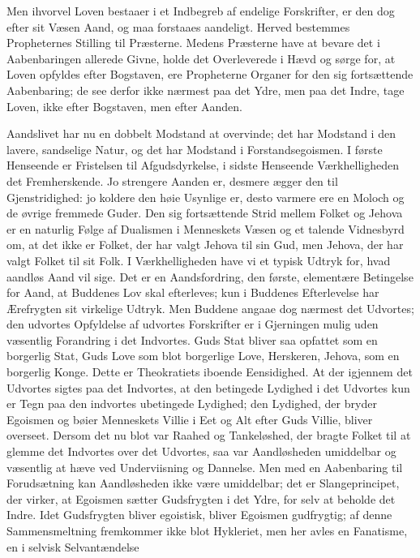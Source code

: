 \documentclass[12pt]{book}
\begin{document}
Men ihvorvel Loven bestaaer i et Indbegreb af endelige Forskrifter,
er den dog efter sit Væsen Aand, og maa forstaaes aandeligt. Herved
bestemmes Propheternes Stilling til Præsterne. Medens Præsterne have
at bevare det i Aabenbaringen allerede Givne, holde det Overleverede
i Hævd og sørge for, at Loven opfyldes efter Bogstaven, ere
Propheterne Organer for den sig fortsættende Aabenbaring; de see
derfor ikke nærmest paa det Ydre, men paa det Indre, tage Loven,
ikke efter Bogstaven, men efter Aanden.

Aandslivet har nu en dobbelt Modstand at overvinde; det har Modstand
i den lavere, sandselige Natur, og det har Modstand i
Forstandsegoismen. I første Henseende er Fristelsen til
Afgudsdyrkelse, i sidste Henseende Værkhelligheden det
Fremherskende. Jo strengere Aanden er, desmere ægger den til
Gjenstridighed: jo koldere den høie Usynlige er, desto varmere ere
en Moloch og de øvrige fremmede Guder. Den sig fortsættende Strid
mellem Folket og Jehova er en naturlig Følge af Dualismen i
Menneskets Væsen og et talende Vidnesbyrd om, at det ikke er Folket,
der har valgt Jehova til sin Gud, men Jehova, der har valgt Folket
til sit Folk. I Værkhelligheden have vi et typisk Udtryk for, hvad
aandløs Aand vil sige. Det er en Aandsfordring, den første,
elementære Betingelse for Aand, at Buddenes Lov skal efterleves; kun
i Buddenes Efterlevelse har Ærefrygten sit virkelige Udtryk. Men
Buddene angaae dog nærmest det Udvortes;
den udvortes Opfyldelse af udvortes Forskrifter er i Gjerningen
mulig uden væsentlig Forandring i det Indvortes. Guds Stat bliver
saa opfattet som en borgerlig Stat, Guds Love som blot borgerlige
Love, Herskeren, Jehova, som en borgerlig Konge. Dette er
Theokratiets iboende Eensidighed. At der igjennem det Udvortes
sigtes paa det Indvortes, at den betingede Lydighed i det Udvortes
kun er Tegn paa den indvortes ubetingede Lydighed; den Lydighed, der
bryder Egoismen og bøier Menneskets Villie i Eet og Alt efter Guds
Villie, bliver overseet. Dersom det nu blot var Raahed og
Tankeløshed, der bragte Folket til at glemme det Indvortes over det
Udvortes, saa var Aandløsheden umiddelbar og væsentlig at hæve ved
Underviisning og Dannelse. Men med en Aabenbaring til Forudsætning
kan Aandløsheden ikke være umiddelbar; det er Slangeprincipet, der
virker, at Egoismen sætter Gudsfrygten i det Ydre, for selv at
beholde det Indre. Idet Gudsfrygten bliver egoistisk, bliver
Egoismen gudfrygtig; af denne Sammensmeltning fremkommer ikke blot
Hykleriet, men her avles en Fanatisme, en i selvisk Selvantændelse
\end{document}
